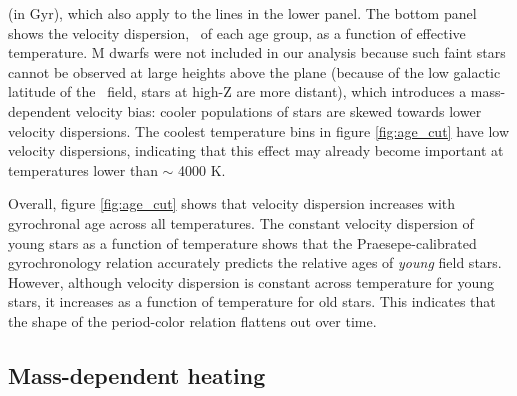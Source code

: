 (in Gyr), which also apply to the lines in the lower panel.
The bottom panel shows the velocity dispersion, \sigmavb\ of each age group,
as a function of effective temperature.
M dwarfs were not included in our analysis because such faint stars cannot be
observed at large heights above the plane (because of the low galactic
latitude of the \kepler\ field, stars at high-Z are more distant), which
introduces a mass-dependent velocity bias: cooler populations of stars are
skewed towards lower velocity dispersions.
The coolest temperature bins in figure \ref{fig:age_cut} have low velocity
dispersions, indicating that this effect may already become important at
temperatures lower than $\sim$ 4000 K.

Overall, figure \ref{fig:age_cut} shows that velocity dispersion increases
with gyrochronal age across all temperatures.
The constant velocity dispersion of young stars as a function of temperature
shows that the Praesepe-calibrated gyrochronology relation accurately predicts
the relative ages of {\it young} field stars.
However, although velocity dispersion is constant across temperature for young
stars, it increases as a function of temperature for old stars.
This indicates that the shape of the period-color relation flattens out over
time.

\subsection{Mass-dependent heating}

